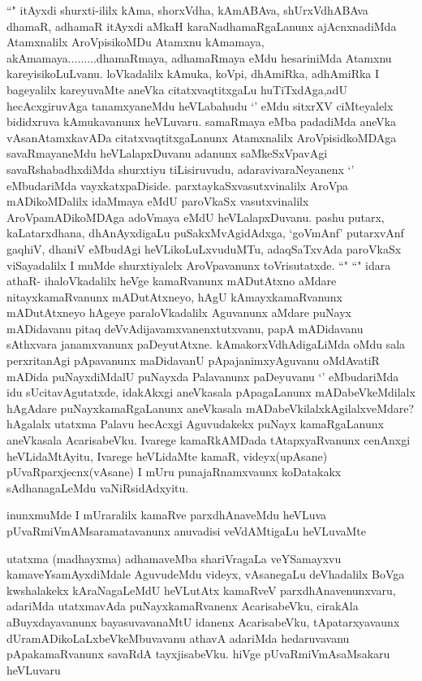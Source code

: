 \begin{artha}
``\stext" itAyxdi shurxti-ililx kAma, shorxVdha, kAmABAva, shUrxVdhABAva dhamaR, adhamaR itAyxdi aMkaH karaNadhamaRgaLanunx ajAcnxnadiMda Atamxnalilx AroVpisikoMDu Atamxnu kAmamaya, akAmamaya.........dhamaRmaya, adhamaRmaya eMdu hesariniMda Atamxnu kareyisikoLuLvanu. loVkadalilx kAmuka, koVpi, dhAmiRka, adhAmiRka I bageyalilx kareyuvaMte aneVka citatxvaqtitxgaLu huTiTxdAga,adU hecAcxgiruvAga tanamxyaneMdu heVLabahudu `\stext' eMdu sitxrXV ciMteyalelx bididxruva kAmukavanunx heVLuvaru. samaRmaya eMba padadiMda aneVka vAsanAtamxkavADa citatxvaqtitxgaLanunx Atamxnalilx AroVpisidkoMDAga savaRmayaneMdu heVLalapxDuvanu adanunx saMkeSxVpavAgi savaRshabadhxdiMda shurxtiyu tiLisiruvudu, adaravivaraNeyanenx `\stext' eMbudariMda vayxkatxpaDiside. parxtaykaSxvasutxvinalilx AroVpa mADikoMDalilx idaMmaya eMdU paroVkaSx vasutxvinalilx AroVpamADikoMDAga adoVmaya eMdU heVLalapxDuvanu. pashu putarx, kaLatarxdhana, dhAnAyxdigaLu puSakxMvAgidAdxga, `goVmAnf' putarxvAnf gaqhiV, dhaniV eMbudAgi heVLikoLuLxvuduMTu, adaqSaTxvAda paroVkaSx viSayadalilx I muMde shurxtiyalelx AroVpavanunx toVrisutatxde. ``\stext" ``\stext" idara athaR- ihaloVkadalilx heVge kamaRvanunx mADutAtxno aMdare nitayxkamaRvanunx mADutAtxneyo, hAgU kAmayxkamaRvanunx mADutAtxneyo hAgeye paraloVkadalilx Aguvanunx aMdare puNayx mADidavanu pitaq deVvAdijavamxvanenxtutxvanu, papA mADidavanu sAthxvara janamxvanunx paDeyutAtxne. kAmakorxVdhAdigaLiMda oMdu sala perxritanAgi pApavanunx maDidavanU pApajanimxyAguvanu oMdAvatiR mADida puNayxdiMdalU puNayxda Palavanunx paDeyuvanu `\stext' eMbudariMda idu sUcitavAgutatxde, idakAkxgi aneVkasala pApagaLanunx mADabeVkeMdilalx hAgAdare puNayxkamaRgaLanunx aneVkasala mADabeVkilalxkAgilalxveMdare? hAgalalx utatxma Palavu hecAcxgi Aguvudakekx puNayx kamaRgaLanunx aneVkasala AcarisabeVku. Ivarege kamaRkAMDada tAtapxyaRvanunx cenAnxgi heVLidaMtAyitu, Ivarege heVLidaMte kamaR, videyx(upAsane) pUvaRparxjecnx(vAsane) I mUru punajaRnamxvaunx koDatakakx sAdhanagaLeMdu vaNiRsidAdxyitu. 
\end{artha}

\begin{artha}
inunxmuMde I mUraralilx kamaRve parxdhAnaveMdu heVLuva pUvaRmiVmAMsaramatavanunx anuvadisi veVdAMtigaLu heVLuvaMte
\end{artha}

\begin{artha}
utatxma (madhayxma) adhamaveMba shariVragaLa veYSamayxvu kamaveYsamAyxdiMdale AguvudeMdu videyx, vAsanegaLu deVhadalilx BoVga kwshalakekx kAraNagaLeMdU heVLutAtx kamaRveV parxdhAnavenunxvaru, adariMda utatxmavAda puNayxkamaRvanenx AcarisabeVku, cirakAla aBuyxdayavanunx bayasuvavanaMtU idanenx AcarisabeVku, tApatarxyavaunx dUramADikoLaLxbeVkeMbuvavanu athavA adariMda hedaruvavanu pApakamaRvanunx savaRdA tayxjisabeVku. hiVge pUvaRmiVmAsaMsakaru heVLuvaru
\end{artha}

